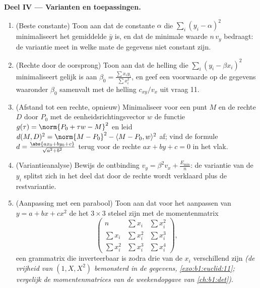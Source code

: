 \begin{problem}
\medskip
\noindent\textbf{Deel IV --- Varianten en toepassingen.}
\begin{enumerate}[resume]
  \item (Beste constante) Toon aan dat de constante $\alpha$ die
        $\sum_i (y_i - \alpha)^2$ minimaliseert het gemiddelde
        $\bar y$ is, en dat de minimale waarde $n\,v_y$ bedraagt:
        de variantie meet in welke mate de gegevens niet constant
        zijn.
  \item (Rechte door de oorsprong) Toon aan dat de helling die
        $\sum_i (y_i - \beta x_i)^2$ minimaliseert gelijk is aan
        $\beta_0 = \frac{\sum x_iy_i}{\sum x_i^2}$, en geef een
        voorwaarde op de gegevens waaronder $\beta_0$ samenvalt met
        de helling $c_{xy}/v_x$ uit vraag 11.
  \item (Afstand tot een rechte, opnieuw) Minimaliseer voor een
        punt $M$ en de rechte $D$ door $P_0$ met de
        eenheidsrichtingsvector $w$ de functie $g(\tau) = \norm{P_0
        + \tau w - M}^2$ en leid $d(M, D)^2 = \norm{M - P_0}^2 -
        \langle M - P_0, w\rangle^2$ af; vind de formule $d =
        \frac{\abs{a x_0 + b y_0 + c}}{\sqrt{a^2 + b^2}}$ terug
        voor de rechte $ax + by + c = 0$ in het vlak.
  \item (Variantieanalyse) Bewijs de ontbinding $v_y = \beta^2 v_x
        + \frac{E_{\min}}n$: de variantie van de $y_i$ splitst zich
        in het deel dat door de rechte wordt verklaard plus de
        restvariantie.
  \item (Aanpassing met een parabool) Toon aan dat voor het
        aanpassen van $y = a + bx + cx^2$ de 
        het $3 \times 3$ stelsel zijn met de momentenmatrix
        \[
        \begin{pmatrix}
        n & \sum x_i & \sum x_i^2\\
        \sum x_i & \sum x_i^2 & \sum x_i^3\\
        \sum x_i^2 & \sum x_i^3 & \sum x_i^4
        \end{pmatrix},
        \]
        een grammatrix die inverteerbaar is zodra drie van de $x_i$
        verschillend zijn \emph{(de vrijheid van $(1, X, X^2)$
        bemonsterd in de gegevens, \cref{exo:b1:euclid:11};
        vergelijk de momentenmatrices van de weekendopgave van
        \cref{ch:b1:det})}.
\end{enumerate}


\end{problem}

